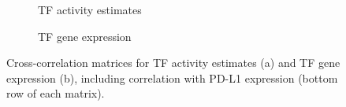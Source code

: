 \begin{table}[h]
    \resizebox{\textwidth}{!}{
    
    }
    \caption{Descriptive statistics for Broad dataset.}
    \label{tab:descr_broad}
\end{table}

\begin{table}[h]
    \resizebox{\textwidth}{!}{
    
    }
    \caption{Descriptive statistics for Sanger dataset.}
    \label{tab:descr_sanger}
\end{table}

\begin{figure}[h]
    \centering
    \begin{subfigure}{0.75\textwidth}
        \centering
        
        \caption{TF activity estimates}
        \label{fig:corr_activity}
    \end{subfigure}

    \vspace{1em}

    \begin{subfigure}{0.75\textwidth}
        \centering
        
        \caption{TF gene expression}
        \label{fig:corr_TPM}
    \end{subfigure}
    \caption{Cross-correlation matrices for TF activity estimates (a) and TF gene expression (b), including correlation with PD-L1 expression (bottom row of each matrix).}
    \label{fig:corr_combined}
\end{figure}